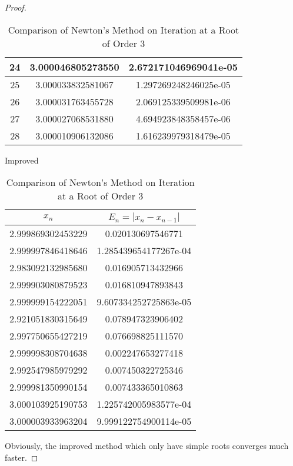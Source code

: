 \begin{enumerate}
\begin{proof}
\begin{table}[htbp]
\begin{subtable}[t]{.49\linewidth}
\begin{tabular}{|c|c|c|}
			\footnotesize	24	&	\footnotesize	3.000046805273550	&	\footnotesize	2.672171046969041e-05	\\	\hline
			\footnotesize	25	&	\footnotesize	3.000033832581067	&	\footnotesize	1.297269248246025e-05	\\	\hline
			\footnotesize	26	&	\footnotesize	3.000031763455728	&	\footnotesize	2.069125339509981e-06	\\	\hline
			\footnotesize	27	&	\footnotesize	3.000027068531880	&	\footnotesize	4.694923848358457e-06	\\	\hline
			\footnotesize	28	&	\footnotesize	3.000010906132086	&	\footnotesize	1.616239979318479e-05	\\	\hline
			\end{tabular}
		\end{subtable}
		\begin{subtable}[t]{.49\linewidth}
			\centering
			\caption{Improved}
			\begin{tabular}{|c|c|}
			\hline
			\(x_n\)				&	\(E_n=|x_n-x_{n-1}|\)	\\	\hline
			\footnotesize	2.999869302453229	&	\footnotesize	0.020130697546771	\\	\hline
			\footnotesize	2.999997846418646	&	\footnotesize	1.285439654177267e-04	\\	\hline
			\footnotesize	2.983092132985680	&	\footnotesize	0.016905713432966	\\	\hline
			\footnotesize	2.999903080879523	&	\footnotesize	0.016810947893843	\\	\hline
			\footnotesize	2.999999154222051	&	\footnotesize	9.607334252725863e-05	\\	\hline
			\footnotesize	2.921051830315649	&	\footnotesize	0.078947323906402	\\	\hline
			\footnotesize	2.997750655427219	&	\footnotesize	0.076698825111570	\\	\hline
			\footnotesize	2.999998308704638	&	\footnotesize	0.002247653277418	\\	\hline
			\footnotesize	2.992547985979292	&	\footnotesize	0.007450322725346	\\	\hline
			\footnotesize	2.999981350990154	&	\footnotesize	0.007433365010863	\\	\hline
			\footnotesize	3.000103925190753	&	\footnotesize	1.225742005983577e-04	\\	\hline
			\footnotesize	3.000003933963204	&	\footnotesize	9.999122754900114e-05	\\	\hline
			\end{tabular}
		\end{subtable}
		\caption{Comparison of Newton's Method on Iteration at a Root of Order 3}
		\label{newtoncompare3}
	\end{table}
	Obviously, the improved method which only have simple roots converges much faster.
	\end{proof}
\end{enumerate}


